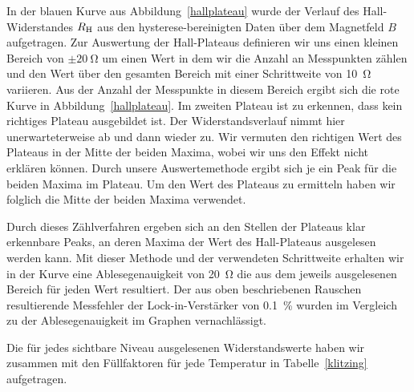 \documentclass[paper=a4,fontsize=10pt,DIV=18,twocolumn,parskip=half]{scrartcl}
\numberwithin{equation}{section}    %
\newcommand{\kor}[1]{{\color{darkgreen}#1}}
\begin{document}
In der blauen Kurve aus Abbildung~\ref{hallplateau} wurde der Verlauf des Hall-Widerstandes $R_{\rm H}$ aus den hysterese-bereinigten Daten über dem Magnetfeld $B$ aufgetragen.
Zur Auswertung der Hall-Plateaus definieren wir uns einen kleinen Bereich von \kor{$\pm \SI{20}{\ohm}$} um einen \kor{Wert} in dem wir die Anzahl an Messpunkten zählen und den \kor{Wert} über den gesamten Bereich mit einer Schrittweite von \SI{10}{\ohm} variieren. Aus der Anzahl der Messpunkte in diesem Bereich ergibt sich die rote Kurve in Abbildung~\ref{hallplateau}. %
\kor{Im zweiten Plateau ist zu erkennen, dass kein richtiges Plateau ausgebildet ist. Der Widerstandsverlauf nimmt hier unerwarteterweise ab und dann wieder zu. Wir vermuten den richtigen Wert des Plateaus in der Mitte der beiden Maxima, wobei wir uns den Effekt nicht erklären können. Durch unsere Auswertemethode ergibt sich je ein Peak für die beiden Maxima im Plateau. Um den Wert des Plateaus zu ermitteln haben wir folglich die Mitte der beiden Maxima verwendet.}

Durch dieses Zählverfahren ergeben sich an den Stellen der Plateaus klar erkennbare Peaks, an deren Maxima der Wert des Hall-Plateaus ausgelesen werden kann. Mit dieser Methode und der verwendeten Schrittweite erhalten wir in der Kurve eine Ablesegenauigkeit von \SI{20}{\ohm} die aus dem jeweils ausgelesenen Bereich für jeden Wert resultiert. \kor{Der aus oben beschriebenen Rauschen resultierende Messfehler der Lock-in-Verstärker von \SI{0.1}{\percent} wurden im Vergleich zu der Ablesegenauigkeit im Graphen vernachlässigt. }

Die für jedes sichtbare Niveau ausgelesenen Widerstandswerte haben wir zusammen mit den Füllfaktoren für jede Temperatur in Tabelle~\ref{klitzing} aufgetragen.
\end{document}
